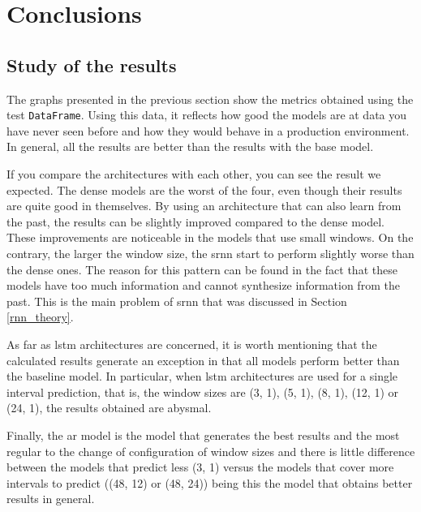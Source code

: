 \section{Conclusions}

\subsection{Study of the results}


The graphs presented in the previous section show the metrics obtained using the test \small{\verb|DataFrame|}\normalsize. Using this data, it reflects how good the models are at data you have never seen before and how they would behave in a production environment. In general, all the results are better than the results with the base model.
\newline

If you compare the architectures with each other, you can see the result we expected. The dense models are the worst of the four, even though their results are quite good in themselves. By using an architecture that can also learn from the past, the results can be slightly improved compared to the dense model. These improvements are noticeable in the models that use small windows. On the contrary, the larger the window size, the \acrshort{srnn} start to perform slightly worse than the dense ones. The reason for this pattern can be found in the fact that these models have too much information and cannot synthesize information from the past. This is the main problem of \acrshort{srnn} that was discussed in Section \ref{rnn_theory}.
\newline

As far as \acrshort{lstm} architectures are concerned, it is worth mentioning that the calculated results generate an exception in that all models perform better than the baseline model. In particular, when \acrshort{lstm} architectures are used for a single interval prediction, that is, the window sizes are (3, 1), (5, 1), (8, 1), (12, 1) or (24, 1), the results obtained are abysmal.
\newline

Finally, the \acrlong{ar} model is the model that generates the best results and the most regular to the change of configuration of window sizes and there is little difference between the models that predict less (3, 1) versus the models that cover more intervals to predict ((48, 12) or (48, 24)) being this the model that obtains better results in general.
\newline

